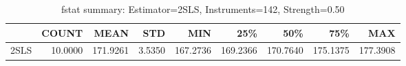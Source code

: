 \begin{table}[ht]
\centering
\caption{fstat summary: Estimator=2SLS, Instruments=142, Strength=0.50}
\begin{tabular}{lrrrrrrrr}
\toprule
 & COUNT & MEAN & STD & MIN & 25\% & 50\% & 75\% & MAX \\
\midrule
2SLS & 10.0000 & 171.9261 & 3.5350 & 167.2736 & 169.2366 & 170.7640 & 175.1375 & 177.3908 \\
\bottomrule
\end{tabular}
\end{table}
